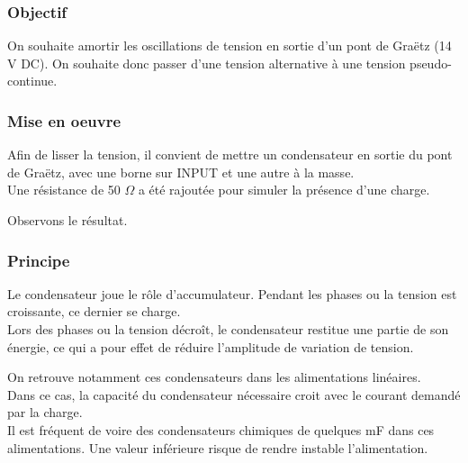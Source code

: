 \subsubsection{Objectif}

On souhaite amortir les oscillations de tension en sortie d'un pont de Graëtz (14 V DC).\n
On souhaite donc passer d'une tension alternative à une tension pseudo-continue.





\subsubsection{Mise en oeuvre}

Afin de lisser la tension, il convient de mettre un condensateur en sortie du pont de Graëtz, avec une borne sur INPUT et une autre à la masse. \\
Une résistance de 50 $\Omega$ a été rajoutée pour simuler la présence d'une charge.


Observons le résultat.


\subsubsection{Principe}

Le condensateur joue le rôle d'accumulateur. Pendant les phases ou la tension est croissante, ce dernier se charge. \\
Lors des phases ou la tension décroît, le condensateur restitue une partie de son énergie, ce qui a pour effet de réduire l'amplitude de variation de tension.\n 

On retrouve notamment ces condensateurs dans les alimentations linéaires. \\
Dans ce cas, la capacité du condensateur nécessaire croit avec le courant demandé par la charge. \\

Il est fréquent de voire des condensateurs chimiques de quelques mF dans ces alimentations. Une valeur inférieure risque de rendre instable l'alimentation.


